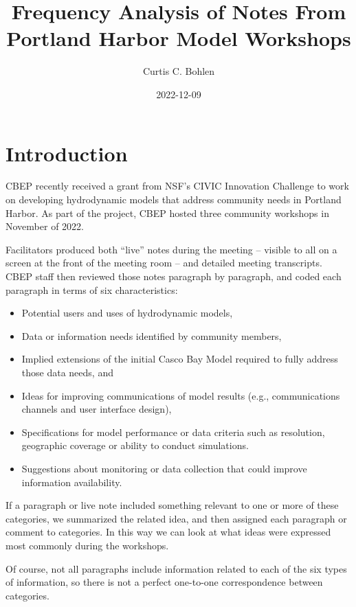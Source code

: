 \documentclass[
]{article}
\title{Frequency Analysis of Notes From Portland Harbor Model Workshops}
\author{Curtis C. Bohlen}
\date{2022-12-09}
\begin{document}
\maketitle

{
\setcounter{tocdepth}{2}
\tableofcontents
}
\hypertarget{introduction}{%
\section{Introduction}\label{introduction}}

CBEP recently received a grant from NSF's CIVIC Innovation Challenge to
work on developing hydrodynamic models that address community needs in
Portland Harbor. As part of the project, CBEP hosted three community
workshops in November of 2022.

Facilitators produced both ``live'' notes during the meeting -- visible
to all on a screen at the front of the meeting room -- and detailed
meeting transcripts. CBEP staff then reviewed those notes paragraph by
paragraph, and coded each paragraph in terms of six characteristics:

\begin{itemize}
\item
  Potential users and uses of hydrodynamic models,
\item
  Data or information needs identified by community members,
\item
  Implied extensions of the initial Casco Bay Model required to fully
  address those data needs, and
\item
  Ideas for improving communications of model results (e.g.,
  communications channels and user interface design),
\item
  Specifications for model performance or data criteria such as
  resolution, geographic coverage or ability to conduct simulations.
\item
  Suggestions about monitoring or data collection that could improve
  information availability.
\end{itemize}

If a paragraph or live note included something relevant to one or more
of these categories, we summarized the related idea, and then assigned
each paragraph or comment to categories. In this way we can look at what
ideas were expressed most commonly during the workshops.

Of course, not all paragraphs include information related to each of the
six types of information, so there is not a perfect one-to-one
correspondence between categories.
\end{document}
